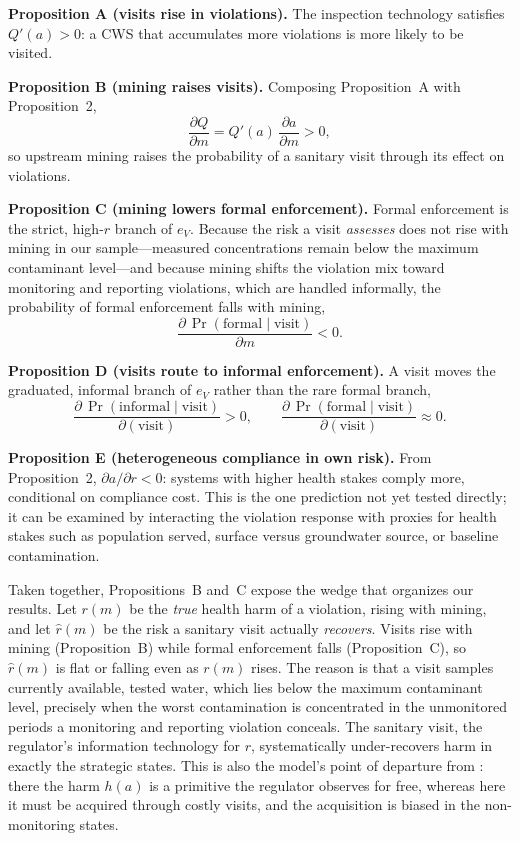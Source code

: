 \documentclass{article}
\begin{document}
\medskip
\noindent\textbf{Proposition A (visits rise in violations).} The inspection technology satisfies $Q'(a) > 0$: a CWS that accumulates more violations is more likely to be visited.

\medskip
\noindent\textbf{Proposition B (mining raises visits).} Composing Proposition~A with Proposition~2,
\[
\frac{\partial Q}{\partial m} = Q'(a)\,\frac{\partial a}{\partial m} > 0 ,
\]
so upstream mining raises the probability of a sanitary visit through its effect on violations.

\medskip
\noindent\textbf{Proposition C (mining lowers formal enforcement).} Formal enforcement is the strict, high-$r$ branch of $e_V$. Because the risk a visit \emph{assesses} does not rise with mining in our sample---measured concentrations remain below the maximum contaminant level---and because mining shifts the violation mix toward monitoring and reporting violations, which are handled informally, the probability of formal enforcement falls with mining,
\[
\frac{\partial\,\Pr(\text{formal}\mid\text{visit})}{\partial m} < 0 .
\]

\medskip
\noindent\textbf{Proposition D (visits route to informal enforcement).} A visit moves the graduated, informal branch of $e_V$ rather than the rare formal branch,
\[
\frac{\partial\,\Pr(\text{informal}\mid\text{visit})}{\partial(\text{visit})} > 0, \qquad \frac{\partial\,\Pr(\text{formal}\mid\text{visit})}{\partial(\text{visit})} \approx 0 .
\]

\medskip
\noindent\textbf{Proposition E (heterogeneous compliance in own risk).} From Proposition~2, $\partial a/\partial r < 0$: systems with higher health stakes comply more, conditional on compliance cost. This is the one prediction not yet tested directly; it can be examined by interacting the violation response with proxies for health stakes such as population served, surface versus groundwater source, or baseline contamination.

\medskip
Taken together, Propositions~B and~C expose the wedge that organizes our results. Let $r(m)$ be the \emph{true} health harm of a violation, rising with mining, and let $\hat{r}(m)$ be the risk a sanitary visit actually \emph{recovers}. Visits rise with mining (Proposition~B) while formal enforcement falls (Proposition~C), so $\hat{r}(m)$ is flat or falling even as $r(m)$ rises. The reason is that a visit samples currently available, tested water, which lies below the maximum contaminant level, precisely when the worst contamination is concentrated in the unmonitored periods a monitoring and reporting violation conceals. The sanitary visit, the regulator's information technology for $r$, systematically under-recovers harm in exactly the strategic states. This is also the model's point of departure from \cite{kang2021understanding}: there the harm $h(a)$ is a primitive the regulator observes for free, whereas here it must be acquired through costly visits, and the acquisition is biased in the non-monitoring states.
\end{document}
